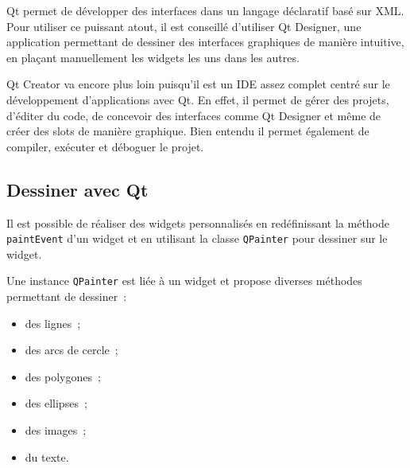Qt permet de développer des interfaces dans un langage déclaratif basé sur XML. Pour utiliser ce puissant atout, il est conseillé d'utiliser Qt Designer, une application permettant de dessiner des interfaces graphiques de manière intuitive, en plaçant manuellement les widgets les uns dans les autres.

Qt Creator va encore plus loin puisqu'il est un IDE assez complet centré sur le développement d'applications avec Qt. En effet, il permet de gérer des projets, d'éditer du code, de concevoir des interfaces comme Qt Designer et même de créer des slots de manière graphique. Bien entendu il permet également de compiler, exécuter et déboguer le projet.

\subsection{Dessiner avec Qt}

Il est possible de réaliser des widgets personnalisés en redéfinissant la méthode \verb|paintEvent| d'un widget et en utilisant la classe \verb|QPainter| pour dessiner sur le widget.

Une instance \verb|QPainter| est liée à un widget et propose diverses méthodes permettant de dessiner~:
\begin{itemize}
	\item des lignes~;
	\item des arcs de cercle~;
	\item des polygones~;
	\item des ellipses~;
	\item des images~;
	\item du texte.
\end{itemize}

